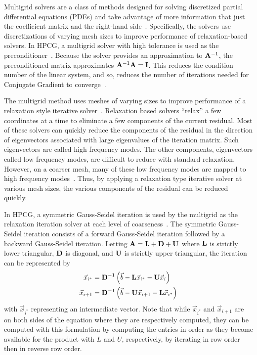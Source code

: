Multigrid solvers are a class of methods designed for solving discretized partial differential equations (PDEs) and take advantage of more information that just the coefficient matrix and the right-hand side~\cite{Saad:2003:IterativeMethods}.
Specifically, the solvers use discretizations of varying mesh sizes to improve performance of relaxation-based solvers.
In HPCG, a multigrid solver with high tolerance is used as the preconditioner~\cite{Dongarra:2015:HPCG}.
Because the solver provides an approximation to \(\mathbf{A}^{-1}\), the preconditioned matrix approximates \(\mathbf{A}^{-1}\mathbf{A} = \mathbf{I}\).\textsl{}
This reduces the condition number of the linear system, and so, reduces the number of iterations needed for Conjugate Gradient to converge~\cite{Saad:2003:IterativeMethods}.

The multigrid method uses meshes of varying sizes to improve performance of a relaxation style iterative solver~\cite{Saad:2003:IterativeMethods}.
Relaxation based solvers ``relax'' a few coordinates at a time to eliminate a few components of the current residual.
Most of these solvers can quickly reduce the components of the residual in the direction of eigenvectors associated with large eigenvalues of the iteration matrix.
Such eigenvectors are called high frequency modes.
The other components, eigenvectors called low frequency modes, are difficult to reduce with standard relaxation.
However, on a coarser mesh, many of these low frequency modes are mapped to high frequency modes~\cite{Saad:2003:IterativeMethods}.
Thus, by applying a relaxation type iterative solver at various mesh sizes, the various components of the residual can be reduced quickly.

In HPCG, a symmetric Gauss-Seidel iteration is used by the multigrid as the relaxation iteration solver at each level of coarseness~\cite{Dongarra:2015:HPCG}.
The symmetric Gauss-Seidel iteration consists of a forward Gauss-Seidel iteration followed by a backward Gauss-Seidel iteration.
Letting \(\mathbf{A} = \mathbf{L}+\mathbf{D}+\mathbf{U}\) where \(\mathbf{L}\) is strictly lower triangular, \(\mathbf{D}\) is diagonal, and \(\mathbf{U}\) is strictly upper triangular, the iteration can be represented by
\begin{align*}
	\vec{x}_{i^*}   &= \mathbf{D}^{-1}\left(\vec{b} - \mathbf{L}\vec{x}_{i^*} - \mathbf{U}\vec{x}_i\right) \\
	\vec{x}_{i+1} &= \mathbf{D}^{-1}\left(\vec{b} - \mathbf{U}\vec{x}_{i+1} - \mathbf{L}\vec{x}_{i^*}\right)
\end{align*}
with \(\vec{x}_{i^*}\) representing an intermediate vector.
Note that while \(\vec{x}_{i^*}\) and \(\vec{x}_{i+1}\) are on both sides of the equation where they are respectively computed, they can be computed with this formulation by computing the entries in order as they become available for the product with \(L\) and \(U\), respectively, by iterating in row order then in reverse row order.
